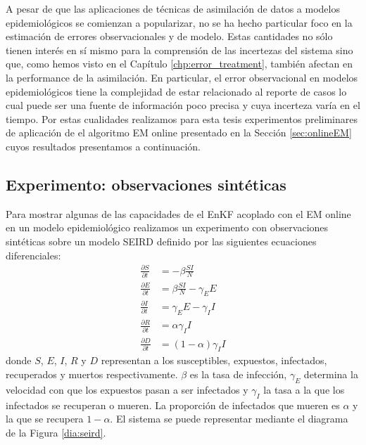 A pesar de que las aplicaciones de técnicas de asimilación de datos a modelos epidemiológicos se comienzan a popularizar, no se ha hecho particular foco en la estimación de errores observacionales y de modelo. Estas cantidades no sólo tienen interés en sí mismo para la comprensión de las incertezas del sistema sino que, como hemos visto en el Capítulo \ref{chp:error_treatment}, también afectan en la performance de la asimilación. En particular, el error observacional en modelos epidemiológicos tiene la complejidad de estar relacionado al reporte de casos lo cual puede ser una fuente de información poco precisa y cuya incerteza varía en el tiempo. Por estas cualidades realizamos para esta tesis experimentos preliminares de aplicación de el algoritmo EM online presentado en la Sección \ref{sec:onlineEM} cuyos resultados presentamos a continuación.

\subsection{Experimento: observaciones sintéticas} \label{sec:online_em_seird_synthetic}
Para mostrar algunas de las capacidades de el EnKF acoplado con el EM online en un modelo epidemiológico realizamos un experimento con observaciones sintéticas sobre un modelo SEIRD definido por las siguientes ecuaciones diferenciales:
\begin{align} \label{eq:seird}
    \frac{\partial S}{\partial t} &= -\beta \frac{SI}{N}\\
    \frac{\partial E}{\partial t} &= \beta \frac{SI}{N} - \gamma_E E \\
    \frac{\partial I}{\partial t} &= \gamma_E E - \gamma_I I \\
    \frac{\partial R}{\partial t} &= \alpha \gamma_I I \\
    \frac{\partial D}{\partial t} &= (1-\alpha) \gamma_I I
\end{align}
donde $S$, $E$, $I$, $R$ y $D$ representan a los susceptibles, expuestos, infectados, recuperados y muertos respectivamente. $\beta$ es la tasa de infección, $\gamma_E$ determina la velocidad con que los expuestos pasan a ser infectados y $\gamma_I$ la tasa a la que los infectados se recuperan o mueren. La proporción de infectados que mueren es $\alpha$ y la que se recupera $1 - \alpha$. El sistema se puede representar mediante el diagrama de la Figura \ref{dia:seird}. 

